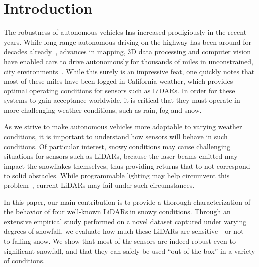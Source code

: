 \section{Introduction}

The robustness of autonomous vehicles has increased prodigiously in the recent years. While long-range autonomous driving on the highway has been around for decades already~\cite{Pomerleau_1996_616}, advances in mapping, 3D data processing and computer vision have enabled cars to drive autonomously for thousands of miles in unconstrained, city environments~\cite{urmson2008autonomous}. While this surely is an impressive feat, one quickly notes that most of these miles have been logged in California weather, which provides optimal operating conditions for sensors such as LiDARs. In order for these systems to gain acceptance worldwide, it is critical that they must operate in more challenging weather conditions, such as rain, fog and snow. 

As we strive to make autonomous vehicles more adaptable to varying weather conditions, it is important to understand how sensors will behave in such conditions. Of particular interest, snowy conditions may cause challenging situations for sensors such as LiDARs, because the laser beams emitted may impact the snowflakes themselves, thus providing returns that to not correspond to solid obstacles. While programmable lighting may help circumvent this problem~\cite{tamburo2014programmable}, current LiDARs may fail under such circumstances. 

In this paper, our main contribution is to provide a thorough characterization of the behavior of four well-known LiDARs in snowy conditions. Through an extensive empirical study performed on a novel dataset captured under varying degrees of snowfall, we evaluate how much these LiDARs are sensitive---or not---to falling snow. We show that most of the sensors are indeed robust even to significant snowfall, and that they can safely be used ``out of the box'' in a variety of conditions. 


